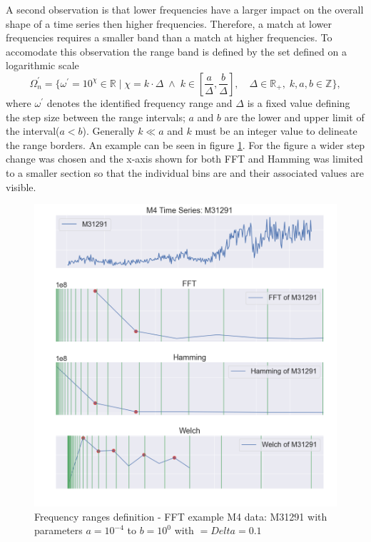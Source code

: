 \documentclass[phd,black, hidelinks]{PrincetonThesis}
\begin{document}
A second observation is that lower frequencies have a larger impact on the overall shape of a time series then higher frequencies. Therefore, a match at lower frequencies requires a smaller band than a match at higher frequencies. To accomodate this observation the range band is defined by the set defined on a logarithmic scale
\begin{equation}
\Omega^{\prime}_n = \{ \omega^{\prime} = 10^\chi \in \mathbb{R} \mid \chi=k \cdot \Delta \; \land \; k \in \left[ \frac{a}{\Delta}, \frac{b}{\Delta}  \right], \quad
\Delta \in \mathbb{R_+}, \; k, a, b \in \mathbb{Z}\},
\end{equation}
where \(\omega^{\prime}\) denotes the identified frequency range and  \(\Delta\) is a fixed value defining the step size between the range intervals; \(a\) and \(b\) are the lower and upper limit of the interval(\(a < b\)). Generally \(k \ll a\) and \(k\) must be an integer value to delineate the range borders. An example can be seen in figure \ref{fig:org104a2c8}. For the figure a wider step change was chosen and the x-axis shown for both FFT and Hamming was limited to a smaller section so that the individual bins are and their associated values are visible.

\begin{figure}[htbp]
\centering
\includegraphics[width=.9\linewidth]{./img/freq_range_example.png}
\caption{\label{fig:org104a2c8}Frequency ranges definition - FFT example M4 data: M31291 with parameters \(a=10^{-4}\) to \(b=10^0\) with \(=Delta=0.1\)}
\end{figure}
\end{document}
